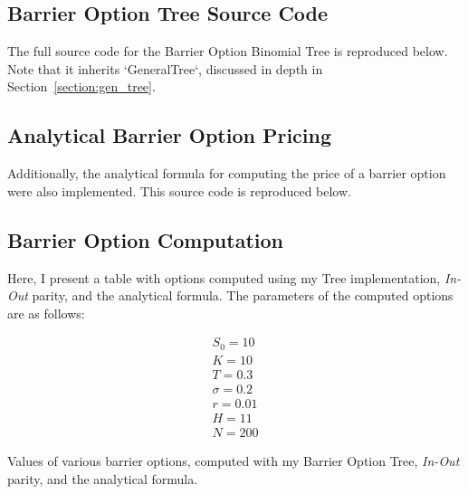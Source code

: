 \documentclass[10pt]{article}
\begin{document}
    \newpage
    \subsection{Barrier Option Tree Source Code}

    The full source code for the Barrier Option Binomial Tree is reproduced below. Note that it inherits `GeneralTree`, discussed in depth in Section~\ref{section:gen_tree}.

    

    \newpage
    \subsection{Analytical Barrier Option Pricing}

    Additionally, the analytical formula for computing the price of a barrier option were also implemented. This source code is reproduced below.

    

    \newpage
    \subsection{Barrier Option Computation}

    Here, I present a table with options computed using my Tree implementation, \textit{In-Out} parity, and the analytical formula. The parameters of the computed options are as follows:

    \begin{gather*}
        S_0 = 10 \\
        K = 10 \\
        T = 0.3 \\
        \sigma = 0.2 \\
        r = 0.01 \\
        H = 11 \\
        N = 200
    \end{gather*}

    \begin{table}[!h]
        \centering
        \caption{Values of various barrier options, computed with my Barrier Option Tree, \textit{In-Out} parity, and the analytical formula.}
        \label{table:barrier_options}
    \end{table}

\end{document}
